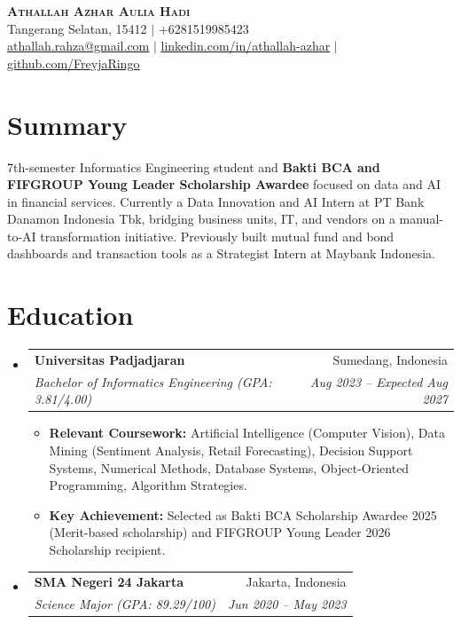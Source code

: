 \documentclass[a4paper,10pt]{article}
\makeatletter
\newcommand{\resumeItem}[1]{
  \item\small{#1}
}
\newcommand{\resumeSubheading}[4]{
  \item
    \begin{tabular*}{0.97\textwidth}[t]{l@{\extracolsep{\fill}}r}
      \textbf{#1} & #2 \\
      \textit{\small#3} & \textit{\small #4} \\
    \end{tabular*}
}
\newcommand{\resumeSubHeadingListStart}{\begin{itemize}[leftmargin=0.15in, label={}, itemsep=4pt, parsep=0pt]}
\newcommand{\resumeSubHeadingListEnd}{\end{itemize}}
\newcommand{\resumeItemListStart}{\begin{itemize}[leftmargin=0.15in, label={$\bullet$}, itemsep=1pt, topsep=2pt, parsep=0pt, partopsep=0pt]}
\newcommand{\resumeItemListEnd}{\end{itemize}}
\makeatother
\begin{document}
\small

\begin{center}
    \textbf{\Huge \scshape Athallah Azhar Aulia Hadi} \\ \vspace{4pt}
    Tangerang Selatan, 15412 $|$ +6281519985423 \\ \vspace{2pt}
    \href{mailto:athallah.rahza@gmail.com}{\underline{athallah.rahza@gmail.com}} $|$ 
    \href{https://linkedin.com/in/athallah-azhar}{\underline{linkedin.com/in/athallah-azhar}} $|$ 
    \href{https://github.com/FreyjaRingo}
    {\underline{github.com/FreyjaRingo}}
\end{center}

\section{Summary}
7th-semester Informatics Engineering student and \textbf{Bakti BCA and FIFGROUP Young Leader Scholarship Awardee} focused on data and AI in financial services. Currently a Data Innovation and AI Intern at PT Bank Danamon Indonesia Tbk, bridging business units, IT, and vendors on a manual-to-AI transformation initiative. Previously built mutual fund and bond dashboards and transaction tools as a Strategist Intern at Maybank Indonesia.

\section{Education}
  \resumeSubHeadingListStart
    \resumeSubheading
      {Universitas Padjadjaran}{Sumedang, Indonesia}
      {Bachelor of Informatics Engineering (GPA: 3.81/4.00)}{Aug 2023 -- Expected Aug 2027}
      \resumeItemListStart
            \resumeItem{\textbf{Relevant Coursework:} Artificial Intelligence (Computer Vision), Data Mining (Sentiment Analysis, Retail Forecasting), Decision Support Systems, Numerical Methods, Database Systems, Object-Oriented Programming, Algorithm Strategies.}
            \resumeItem{\textbf{Key Achievement:} Selected as Bakti BCA Scholarship Awardee 2025 (Merit-based scholarship) and FIFGROUP Young Leader 2026 Scholarship recipient.}
      \resumeItemListEnd
    \resumeSubheading
      {SMA Negeri 24 Jakarta}{Jakarta, Indonesia}
      {Science Major (GPA: 89.29/100)}{Jun 2020 -- May 2023}
  \resumeSubHeadingListEnd

\end{document}
